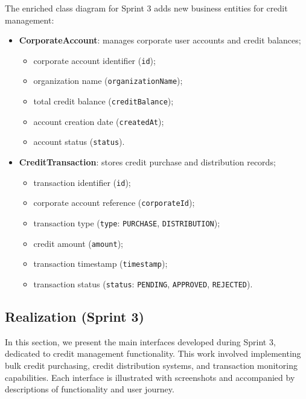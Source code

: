 The enriched class diagram for Sprint 3 adds new business entities for credit management:

\begin{itemize}[nosep,leftmargin=*]
  \item \textbf{CorporateAccount}: manages corporate user accounts and credit balances;
    \begin{itemize}[nosep,leftmargin=*,label=•]
      \item corporate account identifier (\texttt{id});
      \item organization name (\texttt{organizationName});
      \item total credit balance (\texttt{creditBalance});
      \item account creation date (\texttt{createdAt});
      \item account status (\texttt{status}).
    \end{itemize}

  \item \textbf{CreditTransaction}: stores credit purchase and distribution records;
    \begin{itemize}[nosep,leftmargin=*,label=•]
      \item transaction identifier (\texttt{id});
      \item corporate account reference (\texttt{corporateId});
      \item transaction type (\texttt{type}: \texttt{PURCHASE}, \texttt{DISTRIBUTION});
      \item credit amount (\texttt{amount});
      \item transaction timestamp (\texttt{timestamp});
      \item transaction status (\texttt{status}: \texttt{PENDING}, \texttt{APPROVED}, \texttt{REJECTED}).
    \end{itemize}
\end{itemize}


\subsection{Realization (Sprint 3)}

In this section, we present the main interfaces developed during Sprint 3, dedicated to credit management functionality. This work involved implementing bulk credit purchasing, credit distribution systems, and transaction monitoring capabilities. Each interface is illustrated with screenshots and accompanied by descriptions of functionality and user journey.

